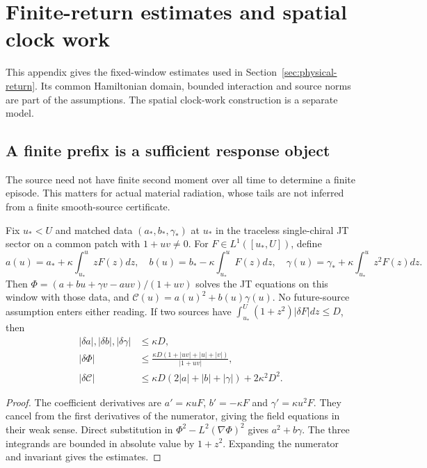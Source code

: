 

\section{Finite-return estimates and spatial clock work}
\label{app:finite-return-details}

This appendix gives the fixed-window estimates used in
Section~\ref{sec:physical-return}. Its common Hamiltonian domain,
bounded interaction and source norms are part of the assumptions.
The spatial clock-work construction is a separate model.

\subsection{A finite prefix is a sufficient response object}

The source need not have finite second moment over all time to determine a
finite episode. This matters for actual material radiation, whose tails
are not inferred from a finite smooth-source certificate.

\begin{proposition}
\label{prop:finite-prefix-response}
Fix $u_*<U$ and matched data $(a_*,b_*,\gamma_*)$ at $u_*$ in the
traceless single-chiral JT sector on a common patch with $1+uv\ne0$.
For $F\in L^1([u_*,U])$, define
\[
 a(u)=a_*+\kappa\int_{u_*}^{u}zF(z)dz,\quad
 b(u)=b_*-\kappa\int_{u_*}^{u}F(z)dz,\quad
 \gamma(u)=\gamma_*+\kappa\int_{u_*}^{u}z^2F(z)dz.
\]
Then $\Phi=(a+bu+\gamma v-auv)/(1+uv)$ solves the JT equations
on this window with those data, and
$\mathcal C(u)=a(u)^2+b(u)\gamma(u)$. No future-source assumption
enters either reading. If two sources have
$\int_{u_*}^{U}(1+z^2)|\delta F|dz\le D$, then
\begin{align}
 |\delta a|,|\delta b|,|\delta\gamma|&\le\kappa D,\nonumber\\
 |\delta\Phi|&\le
 \frac{\kappa D(1+|uv|+|u|+|v|)}{|1+uv|},\label{eq:prefix-tolerance}\\
 |\delta\mathcal C|&\le
 \kappa D(2|a|+|b|+|\gamma|)+2\kappa^2D^2.\nonumber
\end{align}
\end{proposition}
\begin{proof}
The coefficient derivatives are $a'=\kappa uF$, $b'=-\kappa F$
and $\gamma'=\kappa u^2F$. They cancel from the first derivatives
of the numerator, giving the field equations in their weak sense.
Direct substitution in $\Phi^2-L^2(\nabla\Phi)^2$ gives
$a^2+b\gamma$. The three integrands are bounded in absolute value
by $1+z^2$. Expanding the numerator and invariant gives the estimates.
\end{proof}

